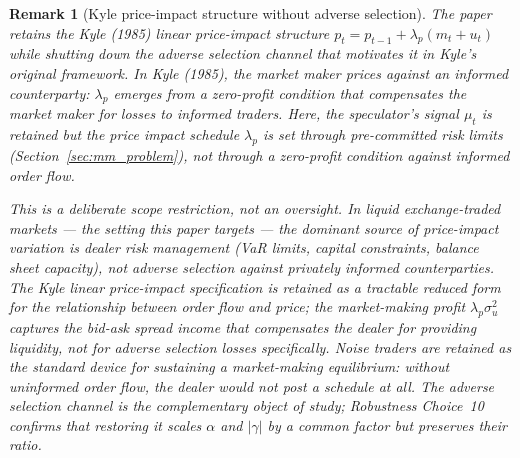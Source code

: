 \documentclass[12pt,a4paper]{article}
\newtheorem{remark}[theorem]{Remark}
\theoremstyle{definition}
\begin{document}
\begin{remark}[Kyle price-impact structure without adverse selection]
\label{rem:kyle_scope}
The paper retains the Kyle (1985) linear price-impact structure
$p_t = p_{t-1} + \lambda_p(m_t + u_t)$ while shutting down the adverse
selection channel that motivates it in Kyle's original framework. In
Kyle (1985), the market maker prices against an informed counterparty:
$\lambda_p$ emerges from a zero-profit condition that compensates the
market maker for losses to informed traders. Here, the speculator's
signal $\mu_t$ is retained but the price impact schedule $\lambda_p$ is
set through pre-committed risk limits (Section~\ref{sec:mm_problem}),
not through a zero-profit condition against informed order flow.

This is a deliberate scope restriction, not an oversight. In liquid
exchange-traded markets --- the setting this paper targets --- the
dominant source of price-impact variation is dealer risk management
(VaR limits, capital constraints, balance sheet capacity), not adverse
selection against privately informed counterparties. The Kyle linear
price-impact specification is retained as a tractable reduced form for
the relationship between order flow and price; the market-making profit
$\lambda_p\sigma^2_u$ captures the bid-ask spread income that
compensates the dealer for providing liquidity, not for adverse
selection losses specifically. Noise traders are retained as the
standard device for sustaining a market-making equilibrium: without
uninformed order flow, the dealer would not post a schedule at all.
The adverse selection channel is the complementary object of study;
Robustness Choice~10 confirms that restoring it scales $\alpha$ and
$|\gamma|$ by a common factor but preserves their ratio.
\end{remark}
\end{document}
